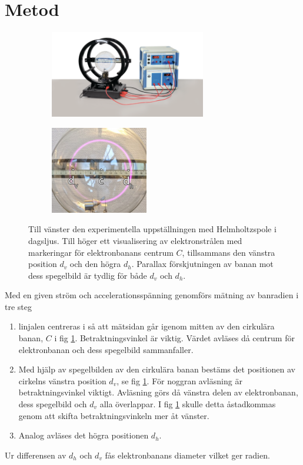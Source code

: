 \documentclass{article}
\begin{document}
\section*{Metod}
\begin{figure}
    \centering
    \begin{subfigure}
        \centering
        \includegraphics[height=1.5in]{helmsetup.png}
    \end{subfigure}
    \begin{subfigure}
        \centering
        \includegraphics[height=1.5in]{helmbeam.png}
    \end{subfigure}
    \caption{\label{fig:coil}Till vänster den experimentella uppställningen med Helmholtzspole i dagsljus. Till höger ett visualisering av elektronstrålen med markeringar för elektronbanans centrum $C$, tillsammans den vänstra position $d_v$ och den högra $d_h$. Parallax förskjutningen av banan mot dess spegelbild är tydlig för både $d_v$ och $d_h$. }
\end{figure}
Med en given ström och accelerationsspänning genomförs mätning av banradien i tre steg
\begin{enumerate}
  \item linjalen centreras i så att mätsidan går igenom mitten av den cirkulära banan, $C$ i fig \ref{fig:coil}. Betraktningsvinkel är viktig. Värdet avläses då centrum för elektronbanan och dess spegelbild sammanfaller. 
  \item Med hjälp av spegelbilden av den cirkulära banan bestäms det positionen av cirkelns vänstra position $d_v$, se fig \ref{fig:coil}. För noggran avläsning är betraktningsvinkel viktigt. Avläsning görs då vänstra delen av elektronbanan, dess spegelbild och $d_v$ alla överlappar. I fig \ref{fig:coil} skulle detta åstadkommas genom att skifta betraktningsvinkeln mer åt vänster.
  \item Analog avläses det högra positionen $d_h$.
\end{enumerate}
Ur differensen av $d_h$ och $d_v$ fås elektronbanans diameter vilket ger radien.
\end{document}
